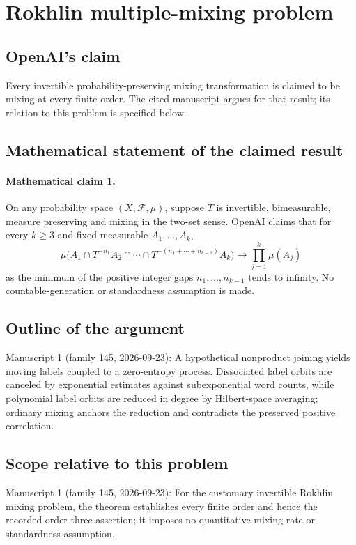 \documentclass[11pt]{article}
\begin{document}
\section*{Rokhlin multiple-mixing problem}

\subsection{OpenAI's claim}
Every invertible probability-preserving mixing transformation is claimed to be mixing at every finite order. The cited manuscript argues for that result; its relation to this problem is specified below.

\subsection{Mathematical statement of the claimed result}
\paragraph{Mathematical claim 1.} On any probability space $(X,\mathcal F,\mu)$, suppose $T$ is invertible, bimeasurable, measure preserving and mixing in the two-set sense. OpenAI claims that for every $k\ge3$ and fixed measurable $A_1,\ldots,A_k$,
\[
\mu\bigl(A_1\cap T^{-n_1}A_2\cap\cdots\cap T^{-(n_1+\cdots+n_{k-1})}A_k\bigr)
\longrightarrow\prod_{j=1}^k\mu(A_j)
\]
as the minimum of the positive integer gaps $n_1,\ldots,n_{k-1}$ tends to infinity. No countable-generation or standardness assumption is made.

\subsection{Outline of the argument}
Manuscript 1 (family 145, 2026-09-23): A hypothetical nonproduct joining yields moving labels coupled to a zero-entropy process. Dissociated label orbits are canceled by exponential estimates against subexponential word counts, while polynomial label orbits are reduced in degree by Hilbert-space averaging; ordinary mixing anchors the reduction and contradicts the preserved positive correlation.

\subsection{Scope relative to this problem}
Manuscript 1 (family 145, 2026-09-23): For the customary invertible Rokhlin mixing problem, the theorem establishes every finite order and hence the recorded order-three assertion; it imposes no quantitative mixing rate or standardness assumption.
\end{document}
